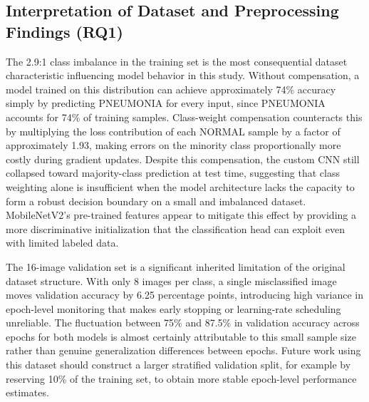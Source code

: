 \documentclass[preprint,12pt]{elsarticle}
\begin{document}
\subsection{Interpretation of Dataset and Preprocessing Findings (RQ1)}
The 2.9:1 class imbalance in the training set is the most consequential
dataset characteristic influencing model behavior in this study.
Without compensation, a model trained on this distribution can achieve
approximately 74\% accuracy simply by predicting PNEUMONIA for every
input, since PNEUMONIA accounts for 74\% of training samples.
Class-weight compensation counteracts this by multiplying the loss
contribution of each NORMAL sample by a factor of approximately 1.93,
making errors on the minority class proportionally more costly during
gradient updates.
Despite this compensation, the custom CNN still collapsed toward
majority-class prediction at test time, suggesting that class weighting
alone is insufficient when the model architecture lacks the capacity
to form a robust decision boundary on a small and imbalanced dataset.
MobileNetV2's pre-trained features appear to mitigate this effect by
providing a more discriminative initialization that the classification
head can exploit even with limited labeled data.

The 16-image validation set is a significant inherited limitation of
the original dataset structure.
With only 8 images per class, a single misclassified image moves
validation accuracy by 6.25 percentage points, introducing high
variance in epoch-level monitoring that makes early stopping or
learning-rate scheduling unreliable.
The fluctuation between 75\% and 87.5\% in validation accuracy across
epochs for both models is almost certainly attributable to this small
sample size rather than genuine generalization differences between
epochs.
Future work using this dataset should construct a larger stratified
validation split, for example by reserving 10\% of the training set,
to obtain more stable epoch-level performance estimates.

\end{document}
